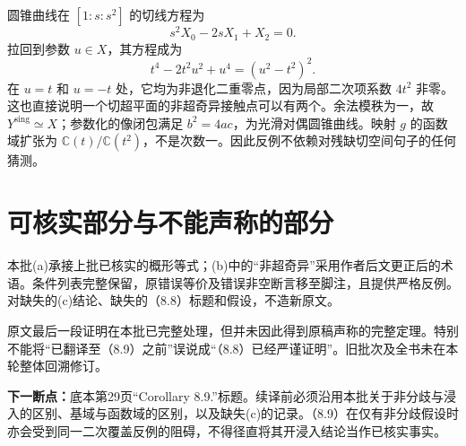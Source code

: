 \documentclass{ctexbook}
\newcommand{\Ys}{Y^{\mathrm{sing}}}
\begin{document}
圆锥曲线在 $[1:s:s^2]$ 的切线方程为
\[
s^2X_0-2sX_1+X_2=0.
\]
拉回到参数 $u\in X$，其方程成为
\[
t^4-2t^2u^2+u^4=(u^2-t^2)^2.
\]
在 $u=t$ 和 $u=-t$ 处，它均为非退化二重零点，因为局部二次项系数 $4t^2$ 非零。这也直接说明一个切超平面的非超奇异接触点可以有两个。余法模秩为一，故 $\Ys\simeq X$；参数化的像闭包满足 $b^2=4ac$，为光滑对偶圆锥曲线。映射 $g$ 的函数域扩张为 $\mathbb C(t)/\mathbb C(t^2)$，不是次数一。因此反例不依赖对残缺切空间句子的任何猜测。

\section*{可核实部分与不能声称的部分}
本批(a)承接上批已核实的概形等式；(b)中的“非超奇异”采用作者后文更正后的术语。条件列表完整保留，原错误等价及错误非空断言移至脚注，且提供严格反例。对缺失的(c)结论、缺失的（8.8）标题和假设，不造新原文。

原文最后一段证明在本批已完整处理，但并未因此得到原稿声称的完整定理。特别不能将“已翻译至（8.9）之前”误说成“（8.8）已经严谨证明”。旧批次及全书未在本轮整体回溯修订。

\textbf{下一断点：}底本第29页“Corollary 8.9.”标题。续译前必须沿用本批关于非分歧与浸入的区别、基域与函数域的区别，以及缺失(c)的记录。（8.9）在仅有非分歧假设时亦会受到同一二次覆盖反例的阻碍，不得径直将其开浸入结论当作已核实事实。
\end{document}
